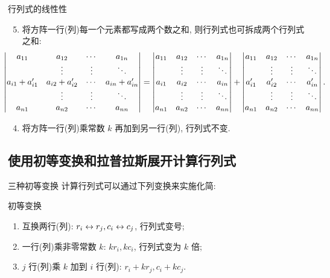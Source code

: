 \begin{frame}{行列式的线性性}
	\onslide<+->
	\begin{alertblock@}
		\begin{enumerate}
			\setcounter{enumi}{4}
			\item 将方阵一行(列)每一个元素都写成两个数之和, 则行列式也可拆成两个行列式之和:
		\[\hspace{-8mm}\detm{a_{11}&a_{12}&\cdots&a_{1n}\\
		&\vdots&\vdots&\ddots\\
		a_{i1}+a'_{i1}&a_{i2}+a'_{i2}&\cdots&a_{in}+a'_{in}\\
		&\vdots&\vdots&\ddots\\
		a_{n1}&a_{n2}&\cdots&a_{nn}}=\detm{a_{11}&a_{12}&\cdots&a_{1n}\\
		&\vdots&\vdots&\ddots\\
		a_{i1}&a_{i2}&\cdots&a_{in}\\
		&\vdots&\vdots&\ddots\\
		a_{n1}&a_{n2}&\cdots&a_{nn}}+\detm{a_{11}&a_{12}&\cdots&a_{1n}\\
		&\vdots&\vdots&\ddots\\
		a'_{i1}&a'_{i2}&\cdots&a'_{in}\\
		&\vdots&\vdots&\ddots\\
		a_{n1}&a_{n2}&\cdots&a_{nn}}.\]
		\end{enumerate}
	\end{alertblock@}
	\onslide<+->
	\begin{alertblock@}
		\begin{enumerate}
			\setcounter{enumi}{3}
			\item 将方阵一行(列)乘常数 $k$ 再加到另一行(列), 行列式不变.
		\end{enumerate}
	\end{alertblock@}
\end{frame}


\subsection{使用初等变换和拉普拉斯展开计算行列式}
\begin{frame}{三种初等变换}
	\onslide<+->
	计算行列式可以通过下列变换来实施化简:
	\onslide<+->
	\begin{block}{初等变换}
		\begin{enumerate}
		\item 互换两行(列): \alert{$r_i\leftrightarrow r_j, c_i\leftrightarrow c_j$}, 行列式变号;
		\item 一行(列)乘非零常数 $k$: \alert{$kr_i, kc_i$}, 行列式变为 $k$ 倍;
		\item $j$ 行(列)乘 $k$ 加到 $i$ 行(列): \alert{$r_i+kr_j, c_i+kc_j$}.
	\end{enumerate}
	\end{block}
\end{frame}


